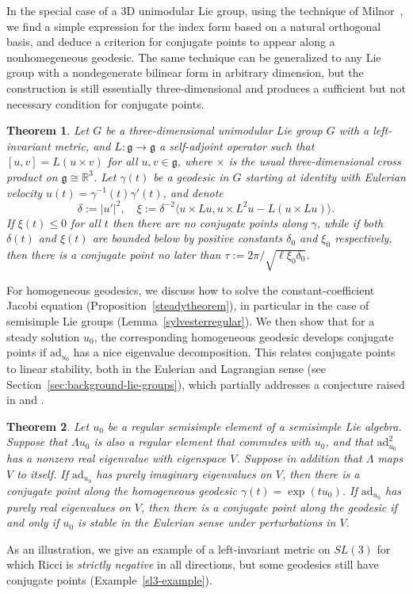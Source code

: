 \documentclass[oneside, 11pt]{amsart}
\newtheorem*{theorem*}{Theorem}
\numberwithin{equation}{section}
\newcommand{\ad}{\mathrm{ad}}
\begin{document}
In the special case of a 3D unimodular Lie group, using the technique of Milnor~\cite{Milnor}, we find a simple expression for the index form based on a natural orthogonal basis, and deduce a criterion for conjugate points to appear along a nonhomegeneous geodesic. The same technique can be generalized to any  
Lie group with a nondegenerate bilinear form in arbitrary dimension, but the construction is still essentially three-dimensional and produces a sufficient but not necessary condition for conjugate points. 
\begin{theorem*}
Let $G$ be a three-dimensional unimodular Lie group $G$ with a left-invariant metric, and $L\colon \mathfrak{g}\to\mathfrak{g}$ a self-adjoint operator such that $[u,v] = L(u\times v)$ for all $u,v\in \mathfrak{g}$, where $\times$ is the usual three-dimensional cross product on $\mathfrak{g}\cong \mathbb{R}^3$. Let $\gamma(t)$ be a geodesic in $G$ starting at identity with Eulerian velocity $u(t)=\gamma^{-1}(t)\gamma'(t)$,  
and denote
$$\delta:=|u'|^2,\quad \xi := \delta^{-2} \langle u\times Lu, u\times L^2u - L(u\times Lu)\rangle.$$ 
If $\xi(t)\le 0$ for all $t$ then there are no conjugate points along $\gamma$, while if both $\delta(t)$ and $\xi(t)$ are bounded below by positive constants $\delta_0$ and $\xi_0$ respectively, then there is a conjugate point no later than $\tau := 2\pi/\sqrt{\ell \xi_0\delta_0}$. 
\end{theorem*}
For homogeneous geodesics, we discuss how to solve the constant-coefficient Jacobi equation (Proposition~\ref{steadytheorem}), in particular in the case of semisimple Lie groups (Lemma~\ref{sylvesterregular}).  We then show that for a steady solution $u_0$, the corresponding homogeneous geodesic develops conjugate points if $\ad_{u_0}$ has a nice eigenvalue decomposition. This relates conjugate points to linear stability, both in the Eulerian and Lagrangian sense (see Section~\ref{sec:background-lie-groups}), which partially addresses a conjecture raised in \cite{DMSY} and \cite{TauchiYoneda}.
\begin{theorem*}
    Let $u_0$ be a regular semisimple element of a semisimple Lie algebra. 
    Suppose that $\Lambda u_0$ is also a regular element that commutes with $u_0$, and that $\ad_{u_0}^2$ has a nonzero real eigenvalue with eigenspace $V$. Suppose in addition that $\Lambda$ maps $V$ to itself.
    If $\ad_{u_0}$ has purely imaginary eigenvalues on $V$, then there is a conjugate point along the homogeneous geodesic $\gamma(t) = \exp{(tu_0)}$. If $\ad_{u_0}$ has purely real eigenvalues on $V$, then there is a conjugate point along the geodesic if and only if $u_0$ is stable in the Eulerian sense under perturbations in $V$.
\end{theorem*}
As an illustration, we give an example of a left-invariant metric on $SL(3)$ for which Ricci is \emph{strictly negative} in all directions, but some geodesics still have conjugate points (Example~\ref{sl3-example}).
\end{document}
